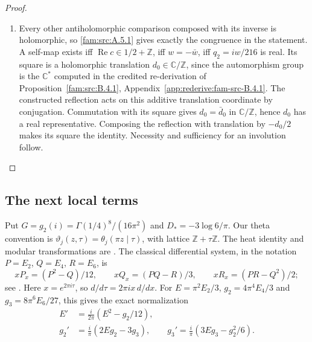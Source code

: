 \begin{proof}
\begin{enumerate}[label=\arabic*.,leftmargin=*]
\item Every other antiholomorphic comparison composed with its inverse is
holomorphic, so \cref{fam:src:A.5.1} gives exactly the congruence in the statement.
A self-map exists iff $\operatorname{Re}c\in1/2+\mathbb Z$, iff
$w=-\bar w$, iff $q_2=iw/216$ is real. Its square is a holomorphic
translation $d_0\in\mathbb C/\mathbb Z$, since the automorphism group
is the $\mathbb C^*$ computed in the credited re-derivation
of Proposition~\ref{fam:src:B.4.1}, Appendix~\ref{app:rederive:fam-src-B.4.1}. The constructed reflection acts on
this additive translation coordinate by conjugation. Commutation
with its square gives $d_0=\bar d_0$ in $\mathbb C/\mathbb Z$, hence
$d_0$ has a real representative. Composing the reflection with
translation by $-d_0/2$ makes its square the identity. Necessity and
sufficiency for an involution follow.
\end{enumerate}
\end{proof}

\subsection{The next local terms}
Put $G=g_2(i)=\Gamma(1/4)^8/(16\pi^2)$ and
$D_*=-3\log6/\pi$.
Our theta convention is
$\vartheta_j(z,\tau)=\theta_j(\pi z\mid\tau)$, with lattice
$\mathbb Z+\tau\mathbb Z$.  The heat identity and modular
transformations are \cite[Equations 20.13.1, 20.7.26, 20.7.30
and 23.18.5]{DLMFTheta2026}.  The classical differential system,
in the notation $P=E_2$, $Q=E_4$, $R=E_6$, is
\[
 xP_x=(P^2-Q)/12,\qquad
 xQ_x=(PQ-R)/3,\qquad
 xR_x=(PR-Q^2)/2;
\]
see \cite[Equations (1.1)--(1.4), p.~1]{ErbanVanGorder2021}.
Here $x=e^{2\pi i\tau}$, so
$d/d\tau=2\pi i x\,d/dx$.
For $E=\pi^2E_2/3$, $g_2=4\pi^4E_4/3$ and
$g_3=8\pi^6E_6/27$, this gives the exact normalization
\[
 \begin{split}
 E'&=\frac{i}{2\pi}(E^2-g_2/12),\\
 g_2'&=\frac{i}{\pi}(2Eg_2-3g_3),\qquad
 g_3'=\frac{i}{\pi}(3Eg_3-g_2^2/6).
 \end{split}
\]

